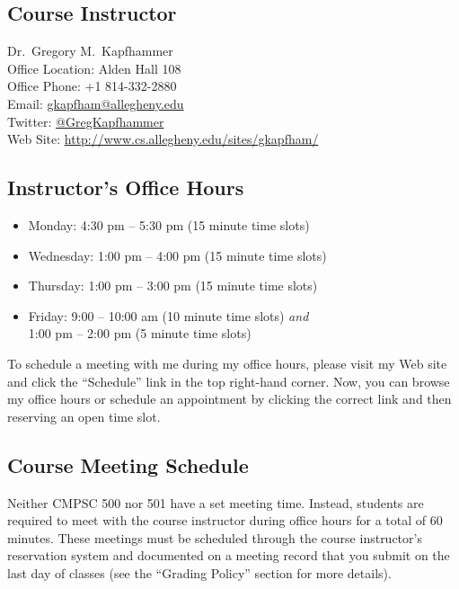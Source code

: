

\usepackage[compact]{titlesec}



\subsection*{Course Instructor}
Dr.\ Gregory M.\ Kapfhammer\\
\noindent Office Location: Alden Hall 108 \\
\noindent Office Phone: +1 814-332-2880 \\
\noindent Email: \url{gkapfham@allegheny.edu} \\
\noindent Twitter: \url{@GregKapfhammer} \\
\noindent Web Site: \url{http://www.cs.allegheny.edu/sites/gkapfham/} 

\subsection*{Instructor's Office Hours}

\begin{itemize}
	\itemsep 0em
	\item Monday: 4:30 pm -- 5:30 pm (15 minute time slots)
	\item Wednesday: 1:00 pm -- 4:00 pm (15 minute time slots)
	\item Thursday: 1:00 pm -- 3:00 pm (15 minute time slots)
	\item Friday: 9:00 -- 10:00 am (10 minute time slots) {\em and} \\ \hspace*{.49in} 1:00 pm -- 2:00 pm (5 minute time slots)
\end{itemize}

\noindent
To schedule a meeting with me during my office hours, please visit my Web site and click the ``Schedule'' link in the
top right-hand corner. Now, you can browse my office hours or schedule an appointment by clicking the correct link and
then reserving an open time slot. 

\subsection*{Course Meeting Schedule}

Neither CMPSC 500 nor 501 have a set meeting time.  Instead, students are required to meet with the course instructor
during office hours for a total of 60 minutes.  These meetings must be scheduled through the course instructor's reservation
system and documented on a meeting record that you submit on the last day of classes (see the ``Grading Policy''
section for more details).

